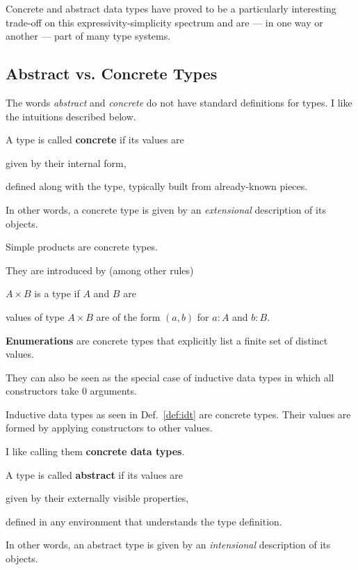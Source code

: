 Concrete and abstract data types have proved to be a particularly interesting trade-off on this expressivity-simplicity spectrum and are --- in one way or another --- part of many type systems.

\subsection{Abstract vs. Concrete Types}

The words \emph{abstract} and \emph{concrete} do not have standard definitions for types.
I like the intuitions described below.

A type is called \textbf{concrete} if its values are
\begin{compactitem}
\item given by their internal form,
\item defined along with the type, typically built from already-known pieces.
\end{compactitem}
In other words, a concrete type is given by an \emph{extensional} description of its objects.

\begin{example}
Simple products are concrete types.

They are introduced by (among other rules)
\begin{compactitem}
 \item $A\times B$ is a type if $A$ and $B$ are
 \item values of type $A\times B$ are of the form $(a,b)$ for $a:A$ and $b:B$.
\end{compactitem}
\end{example}

\begin{example}
\textbf{Enumerations} are concrete types that explicitly list a finite set of distinct values.

They can also be seen as the special case of inductive data types in which all constructors take $0$ arguments.
\end{example}

\begin{example}
Inductive data types as seen in Def.~\ref{def:idt} are concrete types.
Their values are formed by applying constructors to other values.

I like calling them \textbf{concrete data types}.
\end{example}

A type is called \textbf{abstract} if its values are
\begin{compactitem}
\item given by their externally visible properties,
\item defined in any environment that understands the type definition.
\end{compactitem}
In other words, an abstract type is given by an \emph{intensional} description of its objects.

